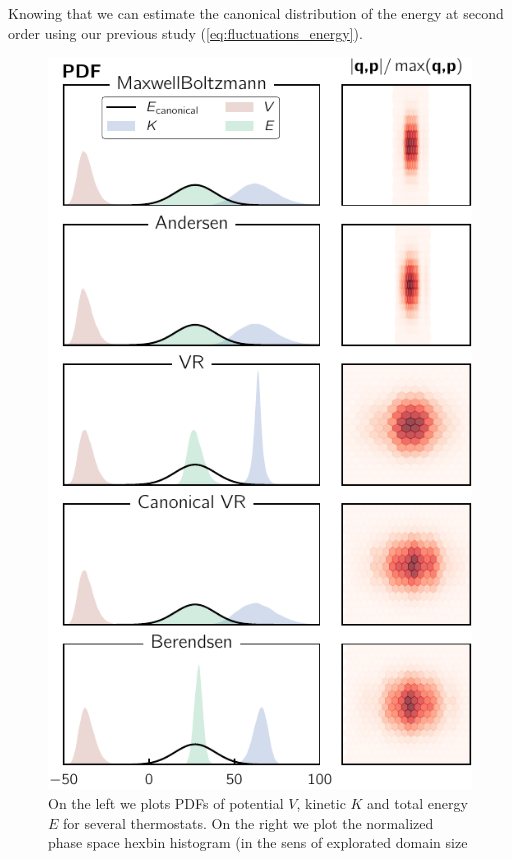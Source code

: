 \documentclass[ansiapaper]{report}
\begin{document}
\begin{multicols}{3}
Knowing that we can estimate the canonical distribution of the energy at second order using our previous study (\ref{eq:fluctuations_energy}).\begin{figure}[H]
    \begin{center}
        \includegraphics[width=1\linewidth]{figures/thermostats_PDF.pdf}
    \end{center}
    \caption{On the left we plots PDFs of potential $V$, kinetic $K$ and total energy $E$ for several thermostats. On the right we plot the normalized phase space hexbin histogram (in the sens of explorated domain size}\label{fig:PDF-th}

\end{figure}
\end{multicols}
\end{document}
